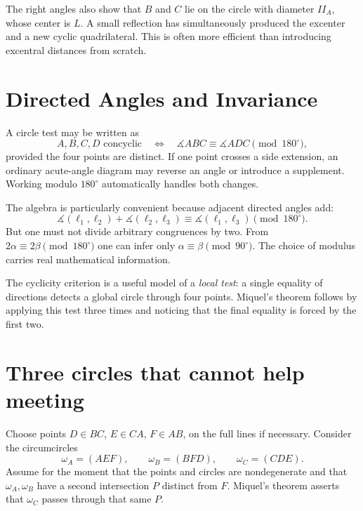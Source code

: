 The right angles also show that \(B\) and \(C\) lie on the circle with diameter \(II_A\), whose center is \(L\). A small reflection has simultaneously produced the excenter and a new cyclic quadrilateral. This is often more efficient than introducing excentral distances from scratch.

\section{Directed Angles and Invariance}

A circle test may be written as
\[
 \boxed{A,B,C,D\text{ concyclic}
 \quad\Longleftrightarrow\quad
 \measuredangle ABC\equiv\measuredangle ADC\pmod{180^\circ},}
\]
provided the four points are distinct. If one point crosses a side extension, an ordinary acute-angle diagram may reverse an angle or introduce a supplement. Working modulo \(180^\circ\) automatically handles both changes.

The algebra is particularly convenient because adjacent directed angles add:
\[
 \measuredangle(\ell_1,\ell_2)+
 \measuredangle(\ell_2,\ell_3)
 \equiv\measuredangle(\ell_1,\ell_3)\pmod{180^\circ}.
\]
But one must not divide arbitrary congruences by two. From \(2\alpha\equiv2\beta\pmod{180^\circ}\) one can infer only
\(\alpha\equiv\beta\pmod{90^\circ}\). The choice of modulus carries real mathematical information.

The cyclicity criterion is a useful model of a \emph{local test}: a single equality of directions detects a global circle through four points. Miquel's theorem follows by applying this test three times and noticing that the final equality is forced by the first two.

\section{Three circles that cannot help meeting}

Choose points \(D\in BC\), \(E\in CA\), \(F\in AB\), on the full lines if necessary. Consider the circumcircles
\[
 \omega_A=(AEF),\qquad
 \omega_B=(BFD),\qquad
 \omega_C=(CDE).
\]
Assume for the moment that the points and circles are nondegenerate and that \(\omega_A,\omega_B\) have a second intersection \(P\) distinct from \(F\). Miquel's theorem asserts that \(\omega_C\) passes through that same \(P\).

